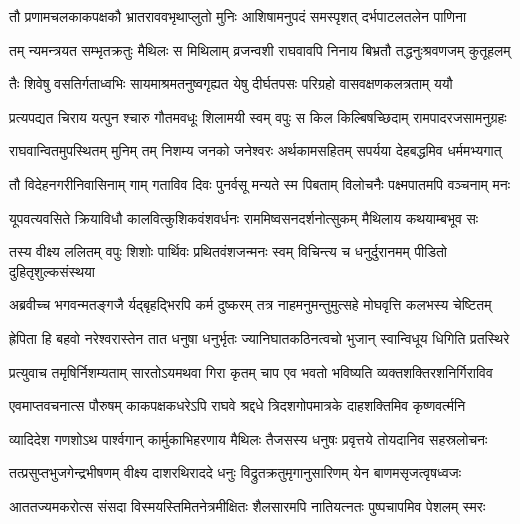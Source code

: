 \fourlineindentedshloka
{तौ प्रणामचलकाकपक्षकौ}
{भ्रातराववभृथाप्लुतो मुनिः}
{आशिषामनुपदं समस्पृशत्}
{दर्भपाटलतलेन पाणिना} %

\fourlineindentedshloka
{तम् न्यमन्त्रयत सम्भृतक्रतुः}
{मैथिलः स मिथिलाम् व्रजन्वशी}
{राघवावपि निनाय बिभ्रतौ}
{तद्धनुःश्रवणजम् कुतूहलम्} %

\fourlineindentedshloka
{तैः शिवेषु वसतिर्गताध्वभिः}
{सायमाश्रमतनुष्वगृह्यत}
{येषु दीर्घतपसः परिग्रहो}
{वासवक्षणकलत्रताम् ययौ} %

\fourlineindentedshloka
{प्रत्यपद्यत चिराय यत्पुन}
{श्चारु गौतमवधूः शिलामयी}
{स्वम् वपुः स किल किल्बिषच्छिदाम्}
{रामपादरजसामनुग्रहः} %

\fourlineindentedshloka
{राघवान्वितमुपस्थितम् मुनिम्}
{तम् निशम्य जनको जनेश्वरः}
{अर्थकामसहितम् सपर्यया}
{देहबद्धमिव धर्ममभ्यगात्} %

\fourlineindentedshloka
{तौ विदेहनगरीनिवासिनाम्}
{गाम् गताविव दिवः पुनर्वसू}
{मन्यते स्म पिबताम् विलोचनैः}
{पक्ष्मपातमपि वञ्चनाम् मनः} %

\fourlineindentedshloka
{यूपवत्यवसिते क्रियाविधौ}
{कालवित्कुशिकवंशवर्धनः}
{राममिष्वसनदर्शनोत्सुकम्}
{मैथिलाय कथयाम्बभूव सः} %

\fourlineindentedshloka
{तस्य वीक्ष्य ललितम् वपुः शिशोः}
{पार्थिवः प्रथितवंशजन्मनः}
{स्वम् विचिन्त्य च धनुर्दुरानमम्}
{पीडितो दुहितृशुल्कसंस्थया} %

\fourlineindentedshloka
{अब्रवीच्च भगवन्मतङ्गजै}
{र्यद्बृहद्भिरपि कर्म दुष्करम्}
{तत्र नाहमनुमन्तुमुत्सहे}
{मोघवृत्ति कलभस्य चेष्टितम्} %

\fourlineindentedshloka
{ह्रेपिता हि बहवो नरेश्वरास्तेन}
{तात धनुषा धनुर्भृतः}
{ज्यानिघातकठिनत्वचो भुजान्}
{स्वान्विधूय धिगिति प्रतस्थिरे} %

\fourlineindentedshloka
{प्रत्युवाच तमृषिर्निशम्यताम्}
{सारतोऽयमथवा गिरा कृतम्}
{चाप एव भवतो भविष्यति}
{व्यक्तशक्तिरशनिर्गिराविव} %

\fourlineindentedshloka
{एवमाप्तवचनात्स पौरुषम्}
{काकपक्षकधरेऽपि राघवे}
{श्रद्दधे त्रिदशगोपमात्रके}
{दाहशक्तिमिव कृष्णवर्त्मनि} %

\fourlineindentedshloka
{व्यादिदेश गणशोऽथ पार्श्वगान्}
{कार्मुकाभिहरणाय मैथिलः}
{तैजसस्य धनुषः प्रवृत्तये}
{तोयदानिव सहस्रलोचनः} %

\fourlineindentedshloka
{तत्प्रसुप्तभुजगेन्द्रभीषणम्}
{वीक्ष्य दाशरथिराददे धनुः}
{विद्रुतक्रतुमृगानुसारिणम्}
{येन बाणमसृजत्वृषध्वजः} %

\fourlineindentedshloka
{आततज्यमकरोत्स संसदा}
{विस्मयस्तिमितनेत्रमीक्षितः}
{शैलसारमपि नातियत्नतः}
{पुष्पचापमिव पेशलम् स्मरः} %

